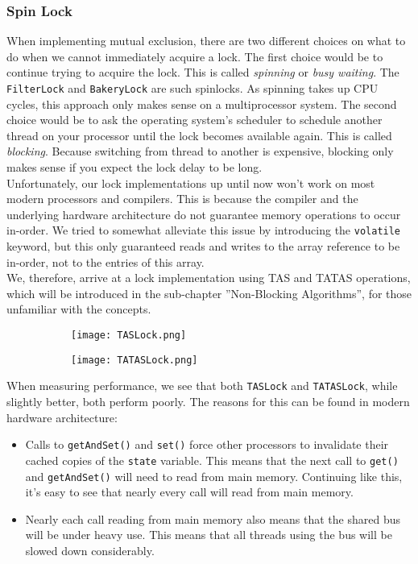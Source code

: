 \documentclass[main]{subfiles}
\begin{document}
\subsubsection{Spin Lock}
When implementing mutual exclusion, there are two different choices on what to do when we cannot immediately acquire a lock. The first choice would be to continue trying to acquire the lock. This is called \textit{spinning} or \textit{busy waiting}. The \texttt{FilterLock} and \texttt{BakeryLock} are such spinlocks. As spinning takes up CPU cycles, this approach only makes sense on a multiprocessor system. The second choice would be to ask the operating system's scheduler to schedule another thread on your processor until the lock becomes available again. This is called \textit{blocking}. Because switching from thread to another is expensive, blocking only makes sense if you expect the lock delay to be long.\\[3mm]
Unfortunately, our lock implementations up until now won't work on most modern processors and compilers. This is because the compiler and the underlying hardware architecture do not guarantee memory operations to occur in-order. We tried to  somewhat alleviate this issue by introducing the \texttt{volatile} keyword, but this only guaranteed reads and writes to the array reference to be in-order, not to the entries of this array.\\[3mm]
We, therefore, arrive at a lock implementation using TAS and TATAS operations, which will be introduced in the sub-chapter ''Non-Blocking Algorithms'', for those unfamiliar with the concepts.
\begin{figure}[h]
    \centering
    \begin{subfigure}{.5\textwidth}
        \centering
        \texttt{[image: TASLock.png]}
    \end{subfigure}%
    \begin{subfigure}{.5\textwidth}
        \centering
        \texttt{[image: TATASLock.png]}
    \end{subfigure}
\end{figure}
When measuring performance, we see that both \texttt{TASLock} and \texttt{TATASLock}, while slightly better, both perform poorly. The reasons for this can be found in modern hardware architecture:
\begin{itemize}
    \item Calls to \texttt{getAndSet()} and \texttt{set()} force other processors to invalidate their cached copies of the \texttt{state} variable. This means that the next call to \texttt{get()} and \texttt{getAndSet()} will need to read from main memory. Continuing like this, it's easy to see that nearly every call will read from main memory.
    \item Nearly each call reading from main memory also means that the shared bus will be under heavy use. This means that all threads using the bus will be slowed down considerably.
\end{itemize}
\end{document}
